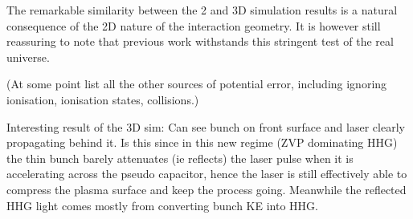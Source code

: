 The remarkable similarity between the 2 and 3D simulation results is a natural consequence of the 2D nature of the interaction geometry. It is however still reassuring to note that previous work withstands this stringent test of the real universe. 

(At some point list all the other sources of potential error, including ignoring ionisation, ionisation states, collisions.)

Interesting result of the 3D sim: Can see bunch on front surface and laser clearly propagating behind it. Is this since in this new regime (ZVP dominating HHG) the thin bunch barely attenuates (ie reflects) the laser pulse when it is accelerating across the pseudo capacitor, hence the laser is still effectively able to compress the plasma surface and keep the process going. Meanwhile the reflected HHG light comes mostly from converting bunch KE into HHG.


